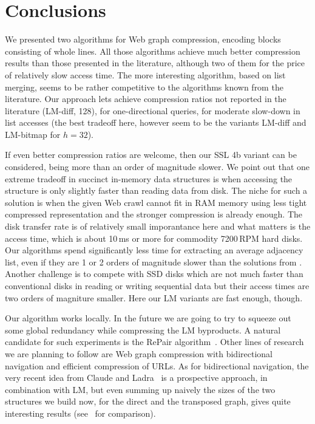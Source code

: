 \documentclass[envcountsame]{llncs}
\begin{document}
\section{Conclusions}


We presented two algorithms for Web graph compression, encoding blocks 
consisting of whole lines. 
All those algorithms achieve much better compression results than those 
presented in the literature, although two of them for the price of relatively slow 
access time. 
The more interesting algorithm, based on list merging, seems to be rather competitive 
to the algorithms known from the literature. 
Our approach lets achieve compression ratios not reported in the literature (LM-diff, 128), 
for one-directional queries, for moderate slow-down in list accesses
(the best tradeoff here, however seem to be the variants LM-diff and LM-bitmap 
for $h = 32$).

If even better compression ratios are welcome, then our SSL 4b variant can be 
considered, being more than an order of magnitude slower.
We point out that one extreme tradeoff in succinct in-memory data 
structures is when accessing the structure is only slightly faster than reading data 
from disk. The niche for such a solution is when the given Web crawl 
cannot fit in RAM memory using less tight compressed representation 
and the stronger compression is already enough.
The disk transfer rate is of relatively small imporantance here 
and what matters is the access time, which is about 10\,ms or more for commodity 
7200\,RPM hard disks.
Our algorithms spend significantly less time for extracting an average adjacency list, 
even if they are 1 or 2 orders of magnitude slower than the solutions from 
\cite{DBLP:conf/www/BoldiV04,CNtr08,DBLP:conf/birthday/ClaudeN10}.
Another challenge is to compete with SSD disks which are not much faster 
than conventional disks in reading or writing sequential data but their access 
times are two orders of magniture smaller. Here our LM variants are fast enough, though. 



Our algorithm works locally.
In the future we are going to try to squeeze out some global redundancy 
while compressing the LM byproducts.
A natural candidate for such experiments is the RePair algorithm~\cite{LM00,CNtweb10}.
Other lines of research we are planning to follow are Web graph compression with 
bidirectional navigation and efficient compression of URLs.
As for bidirectional navigation, the very recent idea from Claude and Ladra~\cite{CL11} 
is a prospective approach, in combination with LM, but even summing up naively the sizes 
of the two structures we build now, for the direct and the transposed graph, 
gives quite interesting results (see~\cite{HNsnakdd11,CL11} for comparison).
\end{document}
